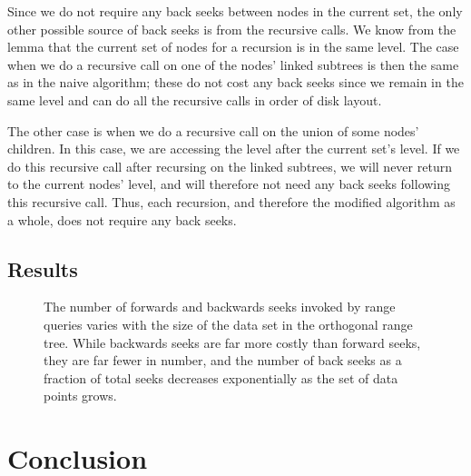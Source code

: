 \documentclass[11pt, oneside]{article}
\begin{document}
Since we do not require any back seeks between nodes in the current set, the
only other possible source of back seeks is from the recursive calls. We know
from the lemma that the current set of nodes for a recursion is in the same
level. The case when we do a recursive call on one of the nodes' linked
subtrees is then the same as in the naive algorithm; these do not cost any back
seeks since we remain in the same level and can do all the recursive calls in
order of disk layout. 

The other case is when we do a recursive call on the union of some nodes'
children. In this case, we are accessing the level after the current set's
level. If we do this recursive call after recursing on the linked subtrees, we
will never return to the current nodes' level, and will therefore not need any
back seeks following this recursive call. Thus, each recursion, and therefore
the modified algorithm as a whole, does not require any back seeks.

\subsection{Results}

\begin{figure}[b!]
\centering
{}%
\caption{
    The number of forwards and backwards seeks invoked by range queries varies
    with the size of the data set in the orthogonal range tree. While
    backwards seeks are far more costly than forward seeks, they are far
    fewer in number, and the number of back seeks as a fraction of total seeks
    decreases exponentially as the set of data points grows.
}
\label{fig:figure2}
\end{figure}

\section{Conclusion}
\end{document}
